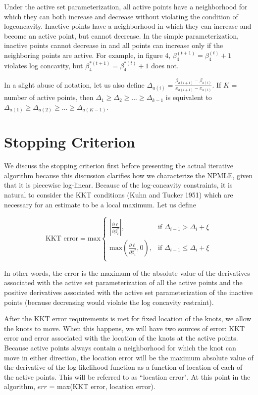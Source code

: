 \documentclass[12pt]{article}
\numberwithin{equation}{section}
\begin{document}
	Under the active set parameterization, all active points have a neighborhood for which they can both increase and decrease without violating the condition of logconcavity. Inactive points have a neighborhood in which they can increase and become an active point, but cannot decrease. In the simple parameterization, inactive points cannot decrease in and all points can increase only if the neighboring points are active. For example, in figure 4, $\beta_4^{(t + 1)} = \beta_4^{(t)} + 1$ violates log concavity, but $\beta_4^{*(t+1)} = \beta_4^{*(t)} + 1$ does not. 
	
	In a slight abuse of notation, let us also define $\Delta_{a(i)} = \frac{\beta_{a(i + 1)} - \beta_{a(i)} } {x_{a(i + 1)} - x_{a(i)} }$. If $K$ = number of active points, then $\Delta_1 \geq \Delta_2 \geq ... \geq \Delta_{k-1}$ is equivalent to $\Delta_{a(1)} \geq \Delta_{a(2)} \geq ... \geq \Delta_{a(K-1)}$. 

			
	{\section{Stopping Criterion} } 
	We discuss the stopping criterion first before presenting the actual iterative algorithm because this discussion clarifies how we characterize the NPMLE, given that it is piecewise log-linear.  Because of the log-concavity constraints, it is natural to consider the KKT conditions (Kuhn and Tucker 1951) which are necessary for an estimate to be a local maximum. Let us define
	
	\[
	\text{KKT error} = {\text{max}} 
	\begin{cases}
		|\frac{\partial \ell } {\partial \beta_i^*}|, & \text{if } \Delta_{i-1} > \Delta_{i} + \xi \\
		\text{max}(\frac{\partial \ell}{\partial \beta_i^*},0 ) , & \text{if } \Delta_{i-1} \leq \Delta_i + \xi \\  
	\end{cases}
	\]
	
	In other words, the error is the maximum of the absolute value of the derivatives associated with the active set parameterization of all the active points and the positive derivatives associated with the active set parameterization of the inactive points (because decreasing would violate the log concavity restraint). 
	
	After the KKT error requirements is met for fixed location of the knots, we allow the knots to move. When this happens, we will have two sources of error: KKT error and error associated with the location of the knots at the active points. Because active points always contain a neighborhood for which the knot can move in either direction, the location error will be the maximum absolute value of the derivative of the log likelihood function as a function of location of each of the active points. This will be referred to as ``location error". At this point in the algorithm, $err$ = max(KKT error, location error). 
	
\end{document}
